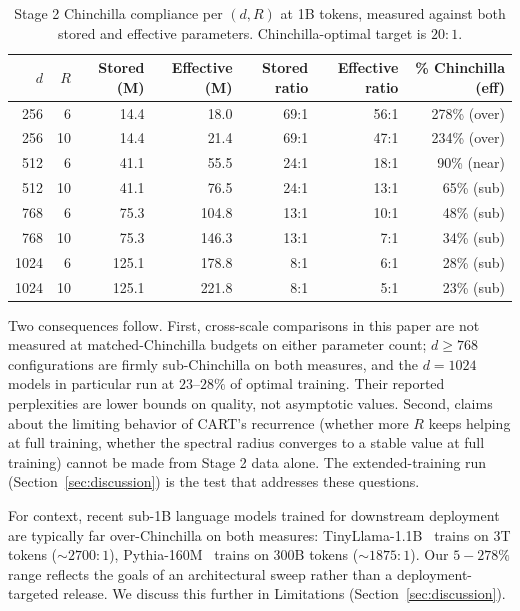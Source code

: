 \documentclass{article}
\newcommand{\cart}{\textsc{CART}}
\begin{document}
\begin{table}[htbp]
\centering
\caption{Stage 2 Chinchilla compliance per $(d, R)$ at 1B tokens, measured against both stored and effective parameters. Chinchilla-optimal target is $20{:}1$.}
\label{tab:chinchilla}
\footnotesize
\begin{tabular}{rrrrrrr}
\toprule
$d$ & $R$ & Stored (M) & Effective (M) & Stored ratio & Effective ratio & \% Chinchilla (eff) \\
\midrule
 256 & 6  & 14.4  & 18.0  & 69:1 & 56:1 & 278\% (over) \\
 256 & 10 & 14.4  & 21.4  & 69:1 & 47:1 & 234\% (over) \\
 512 & 6  & 41.1  & 55.5  & 24:1 & 18:1 &  90\% (near) \\
 512 & 10 & 41.1  & 76.5  & 24:1 & 13:1 &  65\% (sub)  \\
 768 & 6  & 75.3  & 104.8 & 13:1 & 10:1 &  48\% (sub)  \\
 768 & 10 & 75.3  & 146.3 & 13:1 &  7:1 &  34\% (sub)  \\
1024 & 6  & 125.1 & 178.8 &  8:1 &  6:1 &  28\% (sub)  \\
1024 & 10 & 125.1 & 221.8 &  8:1 &  5:1 &  23\% (sub)  \\
\bottomrule
\end{tabular}
\end{table}

Two consequences follow. First, cross-scale comparisons in this paper are not measured at matched-Chinchilla budgets on either parameter count; $d \geq 768$ configurations are firmly sub-Chinchilla on both measures, and the $d{=}1024$ models in particular run at $23$--$28\%$ of optimal training. Their reported perplexities are lower bounds on quality, not asymptotic values. Second, claims about the limiting behavior of \cart{}'s recurrence (whether more $R$ keeps helping at full training, whether the spectral radius converges to a stable value at full training) cannot be made from Stage 2 data alone. The extended-training run (Section~\ref{sec:discussion}) is the test that addresses these questions.

For context, recent sub-1B language models trained for downstream deployment are typically far over-Chinchilla on both measures: TinyLlama-1.1B~\citep{zhang2024tinyllama} trains on 3T tokens ($\sim 2700{:}1$), Pythia-160M~\citep{biderman2023pythia} trains on 300B tokens ($\sim 1875{:}1$). Our $5{-}278\%$ range reflects the goals of an architectural sweep rather than a deployment-targeted release. We discuss this further in Limitations (Section~\ref{sec:discussion}).
\end{document}

